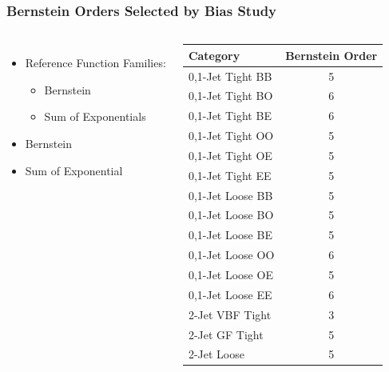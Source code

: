 \documentclass{beamer}
\begin{document}
\begin{frame}
\frametitle{Bernstein Orders Selected by Bias Study}
\vspace{-1em}
\begin{columns}[c]
 \column{60mm}
    \begin{itemize}
      \item Reference Function Families:
      \begin{itemize}
        \item Bernstein
        \item Sum of Exponentials
      \end{itemize}
      \item Bernstein
      \item Sum of Exponential
    \end{itemize}
 \column{60mm}
    \scriptsize
    \begin{center}
      \begin{tabular}{|l|c|} \hline
        Category             & Bernstein Order \\ \hline \hline
        0,1-Jet Tight BB     & 5             \\ \hline
        0,1-Jet Tight BO     &  6            \\ \hline
        0,1-Jet Tight BE     &   6           \\ \hline
        0,1-Jet Tight OO     &  5          \\ \hline
        0,1-Jet Tight OE     &   5         \\ \hline
        0,1-Jet Tight EE     &    5        \\ \hline
        0,1-Jet Loose BB     &     5       \\ \hline
        0,1-Jet Loose BO     & 5      \\ \hline
        0,1-Jet Loose BE     &  5     \\ \hline
        0,1-Jet Loose OO     &   6    \\ \hline
        0,1-Jet Loose OE     &    5   \\ \hline
        0,1-Jet Loose EE     &     6  \\ \hline
        2-Jet VBF Tight      &  3            \\ \hline
        2-Jet GF Tight       &   5           \\ \hline
        2-Jet Loose          &   5           \\ \hline
      \end{tabular}
    \small
    \end{center}
\end{columns}
\end{frame}
\end{document}
